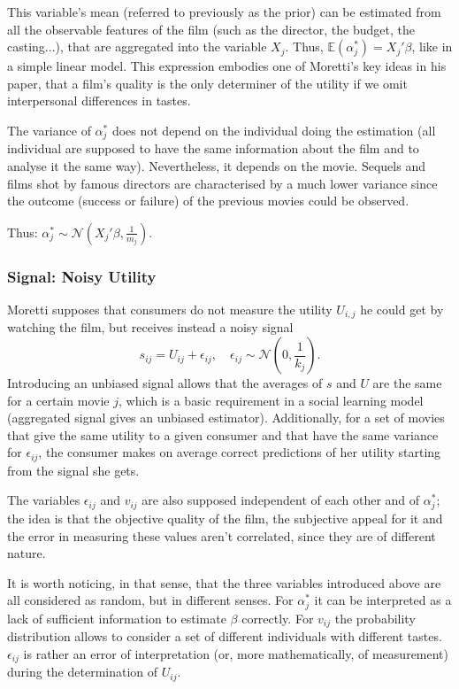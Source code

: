 	This variable's mean (referred to previously as the prior) can be estimated from all the observable features of the film (such as the director, the budget, the casting...), that are aggregated into the variable $X_{j}$. Thus, $\mathbb{E}(\alpha_{j}^{*})=X_{j}'\beta$, like in a simple linear model. This expression embodies one of Moretti's key ideas in his paper, that a film's quality is the only determiner of the utility if we omit interpersonal differences in tastes.

	The variance of $\alpha_{j}^{*}$ does not depend on the individual doing the estimation (all individual are supposed to have the same information about the film and to analyse it the same way). Nevertheless, it depends on the movie. Sequels and films shot by famous directors are characterised by a much lower variance since the outcome (success or failure) of the previous movies could be observed.

	Thus: $\alpha_{j}^{*}\sim \mathcal{N}(X_{j}'\beta,\frac{1}{m_{j}})$.
	
	\subsubsection{Signal: Noisy Utility}
	Moretti supposes that consumers do not measure the utility $U_{i,j}$ he could get by watching the film, but receives instead a noisy signal
	\begin{equation*}
	s_{i j}=U_{i j}+\epsilon_{i j}, \quad\epsilon_{i j}\sim \mathcal{N}(0,\frac{1}{k_{j}}).
	\end{equation*}
	Introducing an unbiased signal allows that the averages of $s$ and $U$ are the same for a certain movie $j$, which is a basic requirement in a social learning model (aggregated signal gives an unbiased estimator). Additionally, for a set of movies that give the same utility to a given consumer and that have the same variance for $\epsilon_{i j}$, the consumer makes on average correct predictions of her utility starting from the signal she gets.

	The variables $\epsilon_{i j}$ and $v_{i j}$ are also supposed independent of each other and of $\alpha_{j}^{*}$; the idea is that the objective quality of the film, the subjective appeal for it and the error in measuring these values aren't correlated, since they are of different nature.

	It is worth noticing, in that sense, that the three variables introduced above are all considered as random, but in different senses. For  $\alpha_{j}^{*}$ it can be interpreted as a lack of sufficient information to estimate $\beta$ correctly. For $v_{i j}$ the probability distribution allows to consider a set of different individuals with different tastes. $\epsilon_{i j}$ is rather an error of interpretation (or, more mathematically, of measurement) during the determination of $U_{i j}$.

